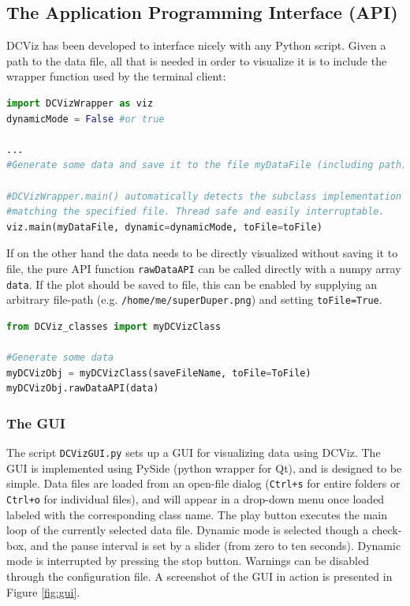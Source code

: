 \subsection{The Application Programming Interface (API)}

DCViz has been developed to interface nicely with any Python script. Given a path to the data file, all that is needed in order to visualize it is to include the wrapper function used by the terminal client:

\vspace{0.5cm}
\begin{lstlisting}[language=Python]
import DCVizWrapper as viz
dynamicMode = False #or true

...
#Generate some data and save it to the file myDataFile (including path)

#DCVizWrapper.main() automatically detects the subclass implementation 
#matching the specified file. Thread safe and easily interruptable.
viz.main(myDataFile, dynamic=dynamicMode, toFile=toFile)
\end{lstlisting}

If on the other hand the data needs to be directly visualized without saving it to file, the pure API function \verb+rawDataAPI+ can be called directly with a numpy array \verb+data+. If the plot should be saved to file, this can be enabled by supplying an arbitrary file-path (e.g. \verb+/home/me/superDuper.png+) and setting \verb+toFile=True+.

\begin{lstlisting}[language=Python]
from DCViz_classes import myDCVizClass

#Generate some data
myDCVizObj = myDCVizClass(saveFileName, toFile=ToFile)
myDCVizObj.rawDataAPI(data)
\end{lstlisting}


\subsubsection{The GUI}

The script \verb+DCVizGUI.py+ sets up a GUI for visualizing data using DCViz. The GUI is implemented using PySide (python wrapper for Qt), and is designed to be simple. Data files are loaded from an open-file dialog (\verb|Ctrl+s| for entire folders or \verb|Ctrl+o| for individual files), and will appear in a drop-down menu once loaded labeled with the corresponding class name. The play button executes the main loop of the currently selected data file. Dynamic mode is selected though a check-box, and the pause interval is set by a slider (from zero to ten seconds). Dynamic mode is interrupted by pressing the stop button. Warnings can be disabled through the configuration file. A screenshot of the GUI in action is presented in Figure \ref{fig:gui}.

